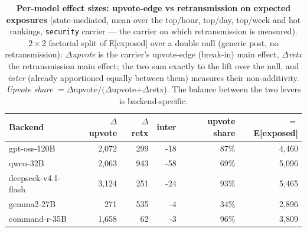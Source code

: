 \begin{table}[t]\centering\small
\caption{\textbf{Per-model effect sizes: upvote-edge vs retransmission on expected exposures} (state-mediated, mean over the top/hour, top/day, top/week and hot rankings, \texttt{security} carrier --- the carrier on which retransmission is measured). $2{\times}2$ factorial split of E[exposed] over a double null (generic post, no retransmission): $\Delta$\emph{upvote} is the carrier's upvote-edge (break-in) main effect, $\Delta$\emph{retx} the retransmission main effect; the two sum exactly to the lift over the null, and \emph{inter} (already apportioned equally between them) measures their non-additivity. \emph{Upvote share} $=\Delta$upvote$/(\Delta$upvote$+\Delta$retx). The balance between the two levers is backend-specific.}
\label{tab:expexp-decomp-bymodel}
\begin{tabular}{@{}l r r r r r@{}}
\toprule
Backend & $\Delta$upvote & $\Delta$retx & inter & upvote share & $=$E[exposed]\\
\midrule
gpt-oss-120B & 2{,}072 & 299 & -18 & 87\% & 4{,}460\\
qwen-32B & 2{,}063 & 943 & -58 & 69\% & 5{,}096\\
deepseek-v4.1-flash & 3{,}124 & 251 & -24 & 93\% & 5{,}465\\
gemma2-27B & 271 & 535 & -4 & 34\% & 2{,}896\\
command-r-35B & 1{,}658 & 62 & -3 & 96\% & 3{,}809\\
\bottomrule
\end{tabular}
\end{table}
